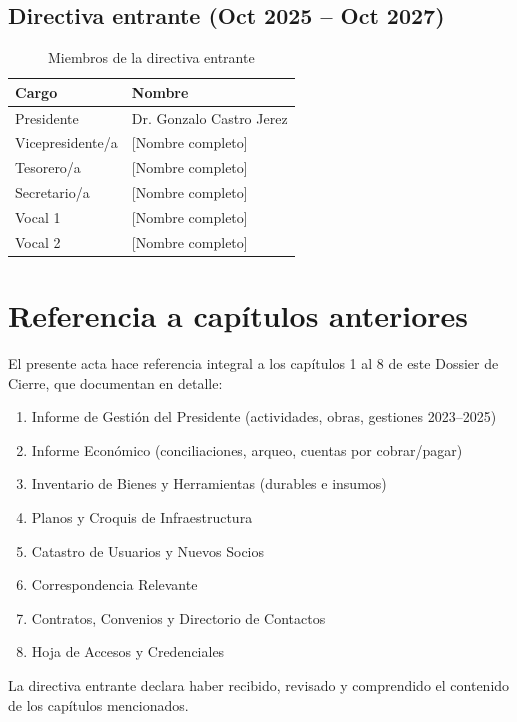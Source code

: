 \subsection*{Directiva entrante (Oct 2025 -- Oct 2027)}

\begin{table}[H]
\centering
\caption{Miembros de la directiva entrante}
\label{tab:directiva-entrante}
\begin{tabularx}{\textwidth}{@{}lX@{}}
\toprule
\textbf{Cargo} & \textbf{Nombre} \\
\midrule
Presidente & Dr. Gonzalo Castro Jerez \\
Vicepresidente/a & [Nombre completo] \\
Tesorero/a & [Nombre completo] \\
Secretario/a & [Nombre completo] \\
Vocal 1 & [Nombre completo] \\
Vocal 2 & [Nombre completo] \\
\bottomrule
\end{tabularx}
\end{table}

\section*{Referencia a capítulos anteriores}

El presente acta hace referencia integral a los capítulos 1 al 8 de este Dossier de Cierre, que documentan en detalle:

\begin{enumerate}
  \item Informe de Gestión del Presidente (actividades, obras, gestiones 2023--2025)
  \item Informe Económico (conciliaciones, arqueo, cuentas por cobrar/pagar)
  \item Inventario de Bienes y Herramientas (durables e insumos)
  \item Planos y Croquis de Infraestructura
  \item Catastro de Usuarios y Nuevos Socios
  \item Correspondencia Relevante
  \item Contratos, Convenios y Directorio de Contactos
  \item Hoja de Accesos y Credenciales
\end{enumerate}

La directiva entrante declara haber recibido, revisado y comprendido el contenido de los capítulos mencionados.

